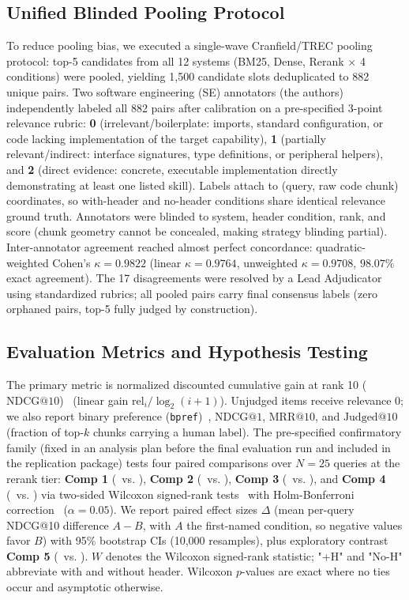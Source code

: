 \subsection{Unified Blinded Pooling Protocol}
\label{sec:approach:pooling}
To reduce pooling bias, we executed a single-wave Cranfield/TREC pooling protocol: top-5 candidates from all 12 systems (BM25, Dense, Rerank $\times$ 4 conditions) were pooled, yielding 1,500 candidate slots deduplicated to 882 unique pairs. 
Two software engineering (SE) annotators (the authors) independently labeled all 882 pairs after calibration on a pre-specified 3-point relevance rubric: \textbf{0} (irrelevant/boilerplate: imports, standard configuration, or code lacking implementation of the target capability), \textbf{1} (partially relevant/indirect: interface signatures, type definitions, or peripheral helpers), and \textbf{2} (direct evidence: concrete, executable implementation directly demonstrating at least one listed skill). Labels attach to (query, raw code chunk) coordinates, so with-header and no-header conditions share identical relevance ground truth. 
Annotators were blinded to system, header condition, rank, and score (chunk geometry cannot be concealed, making strategy blinding partial). 
Inter-annotator agreement reached almost perfect concordance: quadratic-weighted Cohen's $\kappa = 0.9822$ (linear $\kappa = 0.9764$, unweighted $\kappa = 0.9708$, $98.07\%$ exact agreement). 
The 17 disagreements were resolved by a Lead Adjudicator using standardized rubrics; all pooled pairs carry final consensus labels (zero orphaned pairs, top-5 fully judged by construction).

\subsection{Evaluation Metrics and Hypothesis Testing}
\label{sec:approach:metrics}
The primary metric is normalized discounted cumulative gain at rank 10 ($\text{NDCG@10}$)~\cite{jarvelin2002cumulated} (linear gain $\mathrm{rel}_i/\log_2(i+1)$). 
Unjudged items receive relevance 0; we also report binary preference (\texttt{bpref})~\cite{buckley2004bpref}, $\text{NDCG@1}$, $\text{MRR@10}$, and $\text{Judged@10}$ (fraction of top-$k$ chunks carrying a human label). 
The pre-specified confirmatory family (fixed in an analysis plan before the final evaluation run and included in the replication package) tests four paired comparisons over $N=25$ queries at the rerank tier: \textbf{Comp 1} (\astH\ vs. \lineN), \textbf{Comp 2} (\astN\ vs. \lineN), \textbf{Comp 3} (\astH\ vs. \astN), and \textbf{Comp 4} (\lineH\ vs. \lineN) via two-sided Wilcoxon signed-rank tests~\cite{wilcoxon1945individual} with Holm-Bonferroni correction~\cite{holm1979simple} ($\alpha = 0.05$). 
We report paired effect sizes $\Delta$ (mean per-query NDCG@10 difference $A - B$, with $A$ the first-named condition, so negative values favor $B$) with 95\% bootstrap CIs (10,000 resamples), plus exploratory contrast \textbf{Comp 5} (\astH\ vs. \lineH). $W$ denotes the Wilcoxon signed-rank statistic; "+H" and "No-H" abbreviate with and without header. Wilcoxon $p$-values are exact where no ties occur and asymptotic otherwise.
